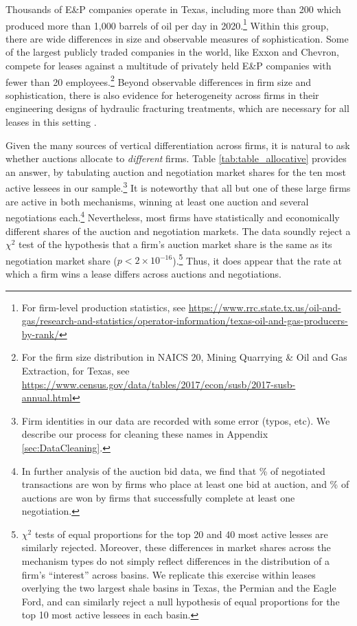 Thousands of E\&P companies operate in Texas, including more than 200 which produced more than 1,000 barrels of oil per day in 2020.\footnote{For firm-level production statistics, see \url{https://www.rrc.state.tx.us/oil-and-gas/research-and-statistics/operator-information/texas-oil-and-gas-producers-by-rank/}} Within this group, there are wide differences in size and observable measures of sophistication. Some of the largest publicly traded companies in the world, like Exxon and Chevron, compete for leases against a multitude of privately held E\&P companies with fewer than 20 employees.\footnote{For the firm size distribution in NAICS 20, Mining Quarrying \& Oil and Gas Extraction, for Texas, see \url{https://www.census.gov/data/tables/2017/econ/susb/2017-susb-annual.html}} Beyond observable differences in firm size and sophistication, there is also evidence for heterogeneity across firms in their engineering designs of hydraulic fracturing treatments, which are necessary for all leases in this setting \citep{bib:covert}. 

Given the many sources of vertical differentiation across firms, it is natural to ask whether auctions allocate to \textit{different} firms. Table \ref{tab:table_allocative} provides an answer, by tabulating auction and negotiation market shares for the ten most active lessees in our sample.\footnote{Firm identities in our data are recorded with some error (typos, etc). We describe our process for cleaning these names in Appendix \ref{sec:DataCleaning}.}  It is noteworthy that all but one of these large firms are active in both mechanisms, winning at least one auction and several negotiations each.\footnote{In further analysis of the auction bid data, we find that \% of negotiated transactions are won by firms who place at least one bid at auction, and \% of auctions are won by firms that successfully complete at least one negotiation.}  Nevertheless, most firms have statistically and economically different shares of the auction and negotiation markets. The data soundly reject a $\chi^2$ test of the hypothesis that a firm's auction market share is the same as its negotiation market share  ($p<2\times 10^{-16}$).\footnote{$\chi^2$ tests of equal proportions for the top 20 and 40 most active lesses are similarly rejected.  Moreover, these differences in market shares across the mechanism types do not simply reflect differences in the distribution of a firm's ``interest'' across basins. We replicate this exercise within leases overlying the two largest shale basins in Texas, the Permian and the Eagle Ford, and can similarly reject a null hypothesis of equal proportions for the top 10 most active lessees in each basin.}  Thus, it does appear that the rate at which a firm wins a lease differs across auctions and negotiations.  

